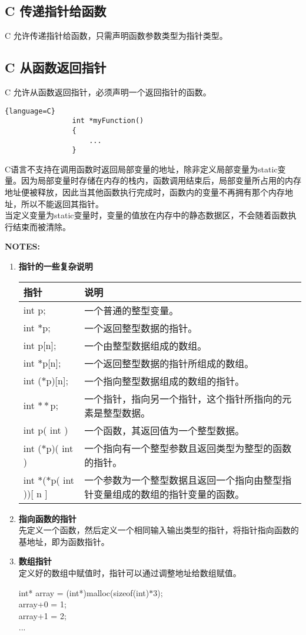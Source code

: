 \documentclass[UTF8]{ctexart}
\begin{document}
			\subsection{C 传递指针给函数}
			C 允许传递指针给函数，只需声明函数参数类型为指针类型。
			\subsection{C 从函数返回指针}
			C 允许从函数返回指针，必须声明一个返回指针的函数。
			\begin{lstlisting}{language=C}
				int *myFunction()
				{
					...
				}
			\end{lstlisting}
			C语言不支持在调用函数时返回局部变量的地址，除非定义局部变量为static变量。因为局部变量时存储在内存的栈内，函数调用结束后，局部变量所占用的内存地址便被释放，因此当其他函数执行完成时，函数内的变量不再拥有那个内存地址，所以不能返回其指针。\\
			当定义变量为static变量时，变量的值放在内存中的静态数据区，不会随着函数执行结束而被清除。
			\begin{framed}
				\textbf{NOTES:}\begin{enumerate}
					\item \textbf{指针的一些复杂说明}\\\begin{tabular*}{\linewidth}{l|p{19em}}
						\toprule
						指针&说明\\
						\midrule
						int p;&一个普通的整型变量。\\
						int $*$p;&一个返回整型数据的指针。\\
						int p[n];&一个由整型数据组成的数组。\\
						int $*$p[n];&一个返回整型数据的指针所组成的数组。\\
						int ($*$p)[n];&一个指向整型数据组成的数组的指针。\\
						int $**$p;&一个指针，指向另一个指针，这个指针所指向的元素是整型数据。\\
						int p( int )&一个函数，其返回值为一个整型数据。\\
						int ($*$p)( int )&一个指向有一个整型参数且返回类型为整型的函数的指针。\\
						int $*$($*$p( int ))[ n ]& 一个参数为一个整型数据且返回一个指向由整型指针变量组成的数组的指针变量的函数。\\
						\bottomrule
					\end{tabular*}
					\item \textbf{指向函数的指针}\\先定义一个函数，然后定义一个相同输入输出类型的指针，将指针指向函数的基地址，即为函数指针。
					\item \textbf{数组指针} \\定义好的数组中赋值时，指针可以通过调整地址给数组赋值。\begin{framed}
						int* array = (int*)malloc(sizeof(int)$*$3);\\
						array+0 = 1;\\
						array+1 = 2;\\
						...
					\end{framed}
				\end{enumerate}
			\end{framed}
\end{document}
